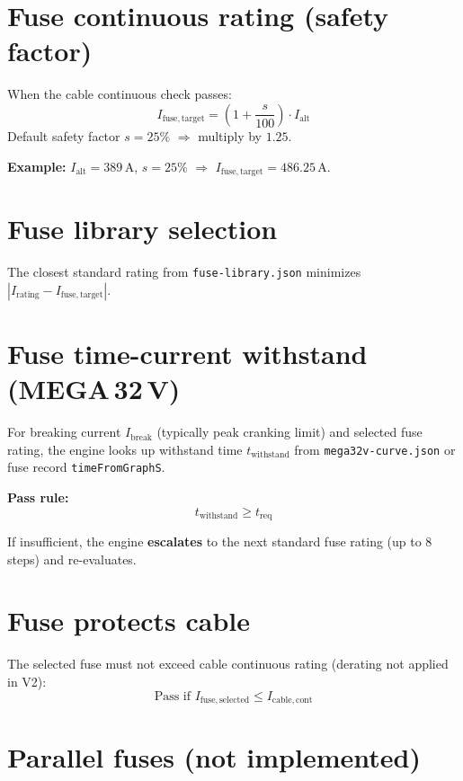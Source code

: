\documentclass[11pt,a4paper]{report}
\begin{document}
\section{Fuse continuous rating (safety factor)}

When the cable continuous check passes:
\begin{equation}
  I_\mathrm{fuse,target} = \left(1 + \frac{s}{100}\right) \cdot I_\mathrm{alt}
\end{equation}
Default safety factor $s = 25\%$ $\Rightarrow$ multiply by $1.25$.

\textbf{Example:} $I_\mathrm{alt} = 389\,\mathrm{A}$, $s=25\%$ $\Rightarrow$ $I_\mathrm{fuse,target} = 486.25\,\mathrm{A}$.

\section{Fuse library selection}

The closest standard rating from \texttt{fuse-library.json} minimizes $|I_\mathrm{rating} - I_\mathrm{fuse,target}|$.

\section{Fuse time-current withstand (MEGA\,32\,V)}

For breaking current $I_\mathrm{break}$ (typically peak cranking limit) and selected fuse rating, the engine looks up withstand time $t_\mathrm{withstand}$ from \texttt{mega32v-curve.json} or fuse record \texttt{timeFromGraphS}.

\textbf{Pass rule:}
\begin{equation}
  t_\mathrm{withstand} \geq t_\mathrm{req}
\end{equation}

If insufficient, the engine \textbf{escalates} to the next standard fuse rating (up to 8 steps) and re-evaluates.

\section{Fuse protects cable}

The selected fuse must not exceed cable continuous rating (derating not applied in V2):
\begin{equation}
  \text{Pass if } I_\mathrm{fuse,selected} \leq I_\mathrm{cable,cont}
\end{equation}

\section{Parallel fuses (not implemented)}
\end{document}

